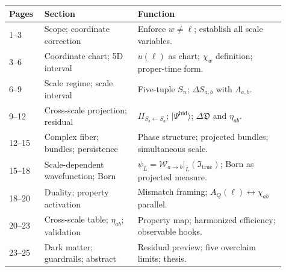 \documentclass[11pt,a4paper,oneside]{article}
\newcommand{\Itrue}{\mathfrak{I}_{\mathrm{true}}}   %
\newcommand{\DSab}{\Delta S_{a,b}}             %
\newcommand{\wcoord}{w}
\newcommand{\PiS}[2]{\Pi_{S_{#2}\leftarrow S_{#1}}}  %
\newcommand{\Wab}{\mathcal{W}_{a\to b}}        %
\newcommand{\etaab}{\eta_{ab}}                 %
\newcommand{\D}{\mathfrak{D}}                  %
\newcommand{\AQ}{A_Q(\ell)}                    %
\newcommand{\chiw}{\chi_w}                     %
\newcommand{\chiab}{\chi_{ab}}                 %
\begin{document}
\begin{longtable}{p{0.11\linewidth}p{0.31\linewidth}p{0.49\linewidth}}
\toprule
Pages & Section & Function \\
\midrule
1--3   & Scope; coordinate correction & Enforce $\wcoord \neq \ell$; establish all scale variables. \\
3--6   & Coordinate chart; 5D interval & $u(\ell)$ as chart; $\chiw$ definition; proper-time form. \\
6--9   & Scale regime; scale interval  & Five-tuple $S_n$; $\DSab$ with $\Lambda_{a,b}$. \\
9--12  & Cross-scale projection; residual & $\PiS{a}{b}$; $|\Psi^{\mathrm{hid}}\rangle$; $\Delta\D$ and $\etaab$. \\
12--15 & Complex fiber; bundles; persistence & Phase structure; projected bundles; simultaneous scale. \\
15--18 & Scale-dependent wavefunction; Born & $\psi_L = \Wab|_L(\Itrue)$; Born as projected measure. \\
18--20 & Duality; property activation & Mismatch framing; $\AQ \leftrightarrow \chiab$ parallel. \\
20--23 & Cross-scale table; $\etaab$; validation & Property map; harmonized efficiency; observable hooks. \\
23--25 & Dark matter; guardrails; abstract & Residual preview; five overclaim limits; thesis. \\
\bottomrule
\end{longtable}
\end{document}
